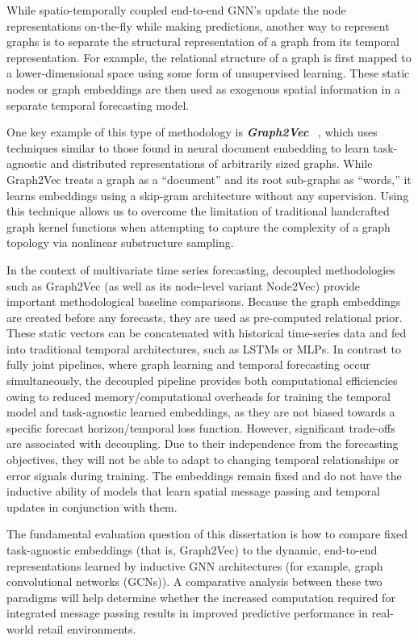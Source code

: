 While spatio-temporally coupled end-to-end GNN's update the node representations on-the-fly while making predictions, another way to represent graphs is to separate the structural representation of a graph from its temporal representation. For example, the relational structure of a graph is first mapped to a lower-dimensional space using some form of unsupervised learning. These static nodes or graph embeddings are then used as exogenous spatial information in a separate temporal forecasting model.

One key example of this type of methodology is \textit{\textbf{Graph2Vec}} ~\cite{narayanan2017graph2vec}, which uses techniques similar to those found in neural document embedding to learn task-agnostic and distributed representations of arbitrarily sized graphs. While Graph2Vec treats a graph as a “document” and its root sub-graphs as “words,” it learns embeddings using a skip-gram architecture without any supervision. Using this technique allows us to overcome the limitation of traditional handcrafted graph kernel functions when attempting to capture the complexity of a graph topology via nonlinear substructure sampling.

In the context of multivariate time series forecasting, decoupled methodologies such as Graph2Vec (as well as its node-level variant Node2Vec\cite{DBLP:journals/corr/GroverL16}) provide important methodological baseline comparisons. Because the graph embeddings are created before any forecasts, they are used as pre-computed relational prior. These static vectors can be concatenated with historical time-series data and fed into traditional temporal architectures, such as LSTMs or MLPs. In contrast to fully joint pipelines, where graph learning and temporal forecasting occur simultaneously, the decoupled pipeline provides both computational efficiencies owing to reduced memory/computational overheads for training the temporal model and task-agnostic learned embeddings, as they are not biased towards a specific forecast horizon/temporal loss function. However, significant trade-offs are associated with decoupling. Due to their independence from the forecasting objectives, they will not be able to adapt to changing temporal relationships or error signals during training. The embeddings remain fixed and do not have the inductive ability of models that learn spatial message passing and temporal updates in conjunction with them.

The fundamental evaluation question of this dissertation is how to compare fixed task-agnostic embeddings (that is, Graph2Vec) to the dynamic, end-to-end representations learned by inductive GNN architectures (for example, graph convolutional networks (GCNs)). A comparative analysis between these two paradigms will help determine whether the increased computation required for integrated message passing results in improved predictive performance in real-world retail environments.

